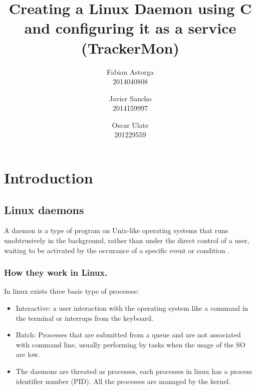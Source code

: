 \documentclass[10pt]{article}
\begin{document}
\date{}

\title{\Large \bf Creating a Linux Daemon using C and configuring it as a service (TrackerMon)}

\author{
{\rm Fabian Astorga}\\ 2014040808
\and
{\rm Javier Sancho}\\2014159997
\and
{\rm Oscar Ulate}\\201229559
}
\maketitle

\thispagestyle{empty}


\section{Introduction}
\subsection{Linux daemons}

A daemon is a type of program on Unix-like operating systems that runs unobtrusively in the background, rather than under the direct control of a user, waiting to be activated by the occurance of a specific event or condition \cite{daemon}.


\subsubsection{How they work in Linux.}

In linux exists three  basic type of processes:
    
\begin{itemize}
    
    \item Interactive: a user interaction with the operating system like a command in the terminal or interrups from the keyboard.
    
    \item Batch: Processes that are submitted from a queue and are not associated with command line, usually performing by tasks when the usage of the SO are low.
    
    \item The daemons are threated as processes, each processes in linux has a process identifier number (PID). All the processes are managed by the kernel.
 
\end{itemize}   
\end{document}
